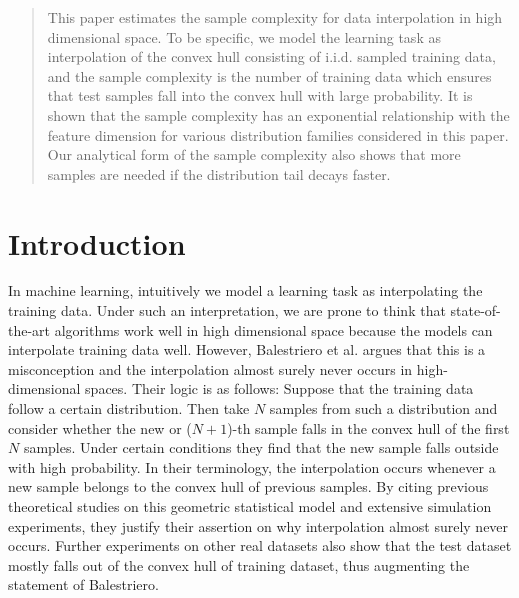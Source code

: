 \documentclass[conference,a4paper]{IEEEtran}
\begin{document}
\maketitle

\begin{abstract}
  This paper estimates the sample complexity for data interpolation in high dimensional space.
  To be specific, we model the learning task as interpolation of the convex hull consisting of i.i.d. sampled training data,
  and the sample complexity is the number of training data which ensures that
  test samples fall into the convex hull
  with large probability. It is shown that the sample complexity has an exponential relationship with the feature dimension for various distribution families
  considered in this paper. Our analytical form of the sample complexity also shows that more samples are needed if the distribution tail decays faster.
\end{abstract}


\section{Introduction}
\label{sec:intro}
In machine learning, intuitively we model a learning task as interpolating the
training data. Under such an interpretation, we are prone to think that state-of-the-art
algorithms work well in high dimensional space because the models can interpolate training data well. 
However, Balestriero et al. \cite{balestriero2021learning}
argues that this is a misconception and the interpolation almost surely never occurs in high-dimensional spaces.
Their logic is as follows: Suppose that the training data follow a certain distribution. Then take $N$ samples from such a distribution
and consider whether the new or ($N+1$)-th sample falls in the convex hull of the first $N$ samples. 
Under certain conditions they find that the new sample falls outside with high probability.
In their terminology, the interpolation occurs whenever a new sample belongs to the convex hull of previous samples.
By citing previous theoretical studies on this geometric statistical model and extensive simulation experiments,
they justify their assertion on why interpolation almost surely never occurs.
Further experiments on other real datasets \cite{yousefzadeh2022extent} also show that
the test dataset mostly falls out of the
convex hull of training dataset, thus augmenting the statement of Balestriero.
\end{document}
